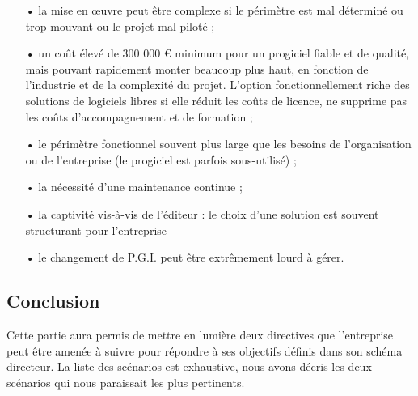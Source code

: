 \begin{itemize}
\item[•]la mise en œuvre peut être complexe si le périmètre est mal déterminé ou trop mouvant ou le projet mal piloté ;
\item[•]un coût élevé de 300 000 € minimum pour un progiciel fiable et de qualité, mais pouvant rapidement monter beaucoup plus haut, en fonction de l'industrie et de la complexité du projet. L'option fonctionnellement riche des solutions de logiciels libres si elle réduit les coûts de licence, ne supprime pas les coûts d'accompagnement et de formation ;
\item[•]le périmètre fonctionnel souvent plus large que les besoins de l'organisation ou de l'entreprise (le progiciel est parfois sous-utilisé) ;
\item[•]la nécessité d'une maintenance continue ;
\item[•]la captivité vis-à-vis de l'éditeur : le choix d'une solution est souvent structurant pour l'entreprise 
\item[•]le changement de P.G.I. peut être extrêmement lourd à gérer.
\end{itemize}

\subsection{Conclusion}
Cette partie aura permis de mettre en lumière deux directives que l'entreprise peut être amenée à suivre pour répondre à ses objectifs définis dans son schéma directeur. La liste des scénarios est exhaustive, nous avons décris les deux scénarios qui nous paraissait les plus pertinents.   